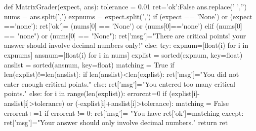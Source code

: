 \begin{edXscript}
def MatrixGrader(expect, ans):
	tolerance = 0.01
	ret={'ok':False}
	ans.replace(' ','')
	nums = ans.split(',')
	expnums = expect.split(',')
	if (expect == 'None') or (expect =='none'):
		ret['ok']= (nums[0] == 'None') or (nums[0]=='none')
	elif (nums[0] == "none") or (nums[0] == "None"):
	    ret['msg']="There are critical points!  your answer should involve decimal numbers only!"
	else:
		try:
			expnum=[float(i) for i in expnums]
			ansnum=[float(i) for i in nums]
			explist = sorted(expnum, key=float)
			anslist = sorted(ansnum, key=float) 
			matching = True
			if len(explist)!=len(anslist):
			    if len(anslist)<len(explist):
			    	ret['msg']="You did not enter enough critical points."
			    else:
			    	ret['msg']="You entered too many critical points."
		 	else:
				for i in range(len(explist)):
					errorcnt=0
					if (explist[i]-anslist[i]>tolerance) or (-explist[i]+anslist[i]>tolerance):
						matching = False
						errorcnt+=1
					if errorcnt != 0:
						ret['msg']= "You have %
				ret['ok']=matching
		except:
		    ret['msg']="Your answer should only involve decimal numbers."
	return ret
  
\end{edXscript}
